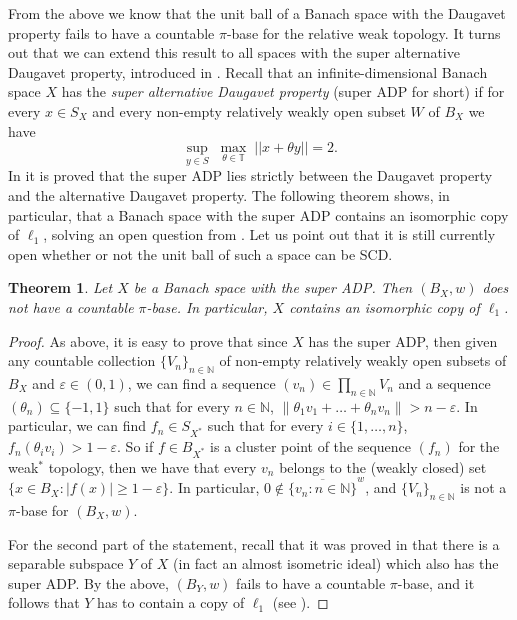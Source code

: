 \documentclass[11pt,a4paper,reqno]{amsart}
\numberwithin{equation}{section}
\newcommand{\abs}[1]{\left\lvert#1\right\rvert}
\newcommand{\norm}[1]{\left\lVert#1\right\rVert}
\newcommand{\N}{\mathbb{N}}
\newcommand{\eps}{\varepsilon}
\newcommand{\1}{\mathbbm{1}}
\renewcommand{\geq}{\geqslant}
\theoremstyle{plain}
\newtheorem{theorem}{Theorem}[section]
\theoremstyle{definition}
\begin{document}
From the above we know that the unit ball of a Banach space with the Daugavet property fails to have a countable $\pi$-base for the relative weak topology. It turns out that we can extend this result to all spaces with the super alternative Daugavet property, introduced in \cite{LLMRZP25}. Recall that an infinite-dimensional Banach space $X$ has the \emph{super alternative Daugavet property} (super ADP for short) if for every $x\in S_X$ and every non-empty relatively weakly open subset $W$ of $B_X$ we have
\[
\underset{y\in S}{\sup}\;\underset{\theta\in \mathbb{T}}{\max}\;||x+\theta y||=2.
\]
In \cite{LLMRZP25} it is proved that the super ADP lies strictly between the Daugavet property and the alternative Daugavet property. The following theorem shows, in particular, that a Banach space with the super ADP contains an isomorphic copy of $\ell_1$, solving an open question from \cite{LLMRZP25}. Let us point out that it is still currently open whether or not the unit ball of such a space can be SCD. 
\begin{theorem}\label{thm:super_ADP_unit_balls_do_not_have_a_weak_pi_base}
    Let $X$ be a Banach space with the super ADP. Then $(B_X,w)$ does not have a countable $\pi$-base. In particular, $X$ contains an isomorphic copy of $\ell_1$.
\end{theorem}
\begin{proof}
As above, it is easy to prove that since $X$ has the super ADP, then given any countable collection $\{V_n\}_{n\in\N}$ of non-empty relatively weakly open subsets of $B_X$ and $\eps\in(0,1)$, we can find a sequence $(v_n)\in\prod_{n\in\N}V_n$ and a sequence $(\theta_n)\subseteq\{-1,1\}$ such that for every $n\in\N$, $\norm{\theta_1 v_1+\dots+\theta_n v_n}> n-\eps$. In particular, we can find $f_n\in S_{X^*}$ such that for every $i\in\{1,\dots,n\}$, $f_n(\theta_iv_i)> 1-\eps$.  So if $f\in B_{X^*}$ is a cluster point of the sequence $(f_n)$ for the weak$^*$ topology, then we have that every $v_n$ belongs to the (weakly closed) set $\{x\in B_X\colon \abs{f(x)}\geq 1-\eps\}$. In particular, $0\notin\overline{\{v_n\colon n\in \N\}}^w$, and $\{V_n\}_{n\in\N}$ is not a $\pi$-base for $(B_X,w)$. 
    
For the second part of the statement, recall that it was proved in \cite{LLMRZP25} that there is a separable subspace $Y$ of $X$ (in fact an almost isometric ideal) which also has the super ADP. By the above, $(B_Y,w)$ fails to have a countable $\pi$-base, and it follows that $Y$ has to contain a copy of $\ell_1$ (see \cite[Theorem~10.1.21]{KMRZW25}).  
\end{proof}
\end{document}
